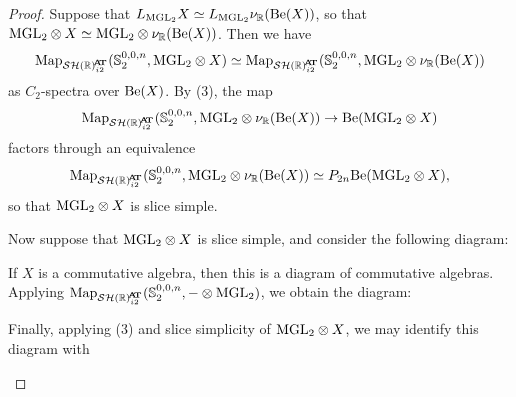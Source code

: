 \begin{proof}
  Suppose that $L_{\mathrm{MGL}_2} X \simeq L_{\mathrm{MGL}_2} \nu_{\mathbb{R}}(\mathrm{Be}(X))$, so that $\mathrm{MGL}_2 \otimes X \simeq \mathrm{MGL}_2 \otimes \nu_{\mathbb{R}}(\mathrm{Be}(X))$.
  Then we have
  \[\Map_{\SHRat} (\Ss_2^{0,0,n}, \MGL_2 \otimes X) \simeq \Map_{\SHRat} (\Ss_2^{0,0,n}, \MGL_2 \otimes \nur(\b(X))\]
  as $C_2$-spectra over $\mathrm{Be}(X)$.
  By (3), the map
  \[\Map_{\SHRat} (\Ss_2^{0,0,n}, \MGL_2 \otimes \nur(\b(X)) \to \b(\MGL_2 \otimes X)\]
  factors through an equivalence
  \[\Map_{\SHRat} (\Ss_2^{0,0,n}, \MGL_2 \otimes \nur(\b(X)) \simeq P_{2n} \b(\MGL_2 \otimes X),\]
  so that $\mathrm{MGL}_2 \otimes X$ is slice simple.

  Now suppose that $\mathrm{MGL}_2 \otimes X$ is slice simple, and
%
%
  consider the following diagram:
  \begin{center}
  \end{center}
  If $X$ is a commutative algebra, then this is a diagram of commutative algebras.
  Applying $\Map_{\SHRat} (\Ss_2^{0,0,n}, - \otimes \MGL_2)$, we obtain the diagram:
  \begin{center}
  \end{center}
  Finally, applying (3) and slice simplicity of $\mathrm{MGL}_2 \otimes X$, we may identify this diagram with
  \begin{center}
  \end{center}

\end{proof}

